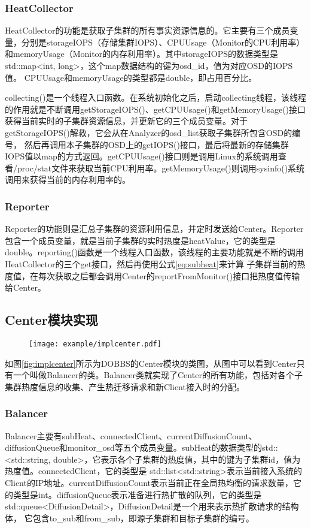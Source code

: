 \subsubsection{HeatCollector}
HeatCollector的功能是获取子集群的所有事实资源信息的。它主要有三个成员变量，分别是storageIOPS（存储集群IOPS）、CPUUsage（Monitor的CPU利用率）和memoryUsage（Monitor的内存利用率）。其中storageIOPS的数据类型是std::map<int, long>，这个map数据结构的键为osd\_id，值为对应OSD的IOPS值。
CPUUsage和memoryUsage的类型都是double，即占用百分比。

collecting()是一个线程入口函数。在系统初始化之后，启动collecting线程，该线程的作用就是不断调用getStorageIOPS()、getCPUUsage()和getMemoryUsage()接口获得当前实时的子集群资源信息，并更新它的三个成员变量。对于getStorageIOPS()解救，它会从在Analyzer的osd\_list获取子集群所包含OSD的编号，
然后再调用本子集群的OSD上的getIOPS()接口，最后将最新的存储集群IOPS值以map的方式返回。getCPUUsage()接口则是调用Linux的系统调用查看/proc/stat文件来获取当前CPU利用率。getMemoryUsage()则调用sysinfo()系统调用来获得当前的内存利用率的。

\subsubsection{Reporter}
Reporter的功能则是汇总子集群的资源利用信息，并定时发送给Center。Reporter包含一个成员变量，就是当前子集群的实时热度是heatValue，它的类型是double。reporting()函数是一个线程入口函数，该线程的主要功能就是不断的调用HeatCollector的三个get接口，然后再使用公式\ref{eq:subheat}来计算
子集群当前的热度值，在每次获取之后都会调用Center的reportFromMonitor()接口把热度值传输给Center。

\subsection{Center模块实现}

\begin{figure}[!htp]
    \centering
    \texttt{[image: example/implcenter.pdf]}
\end{figure}

如图\ref{fig:implcenter}所示为DOBBS的Center模块的类图，从图中可以看到Center只有一个叫做Balancer的类。Balancer类就实现了Center的所有功能，包括对各个子集群热度信息的收集、产生热迁移请求和新Client接入时的分配。

\subsubsection{Balancer}
Balancer主要有subHeat、connectedClient、currentDiffusionCount、diffusionQueue和monitor\_osd等五个成员变量。subHeat的数据类型的std::<std::string, double>，它表示各个子集群的热度值，其中的键为子集群id，值为热度值。connectedClient，它的类型是
std::list<std::string>表示当前接入系统的Client的IP地址。currentDiffusionCount表示当前正在全局热均衡的请求数量，它的类型是int。diffusionQueue表示准备进行热扩散的队列，它的类型是std::queue<DiffusionDetail>，DiffusionDetail是一个用来表示热扩散请求的结构体，
它包含to\_sub和from\_sub，即源子集群和目标子集群的编号。

